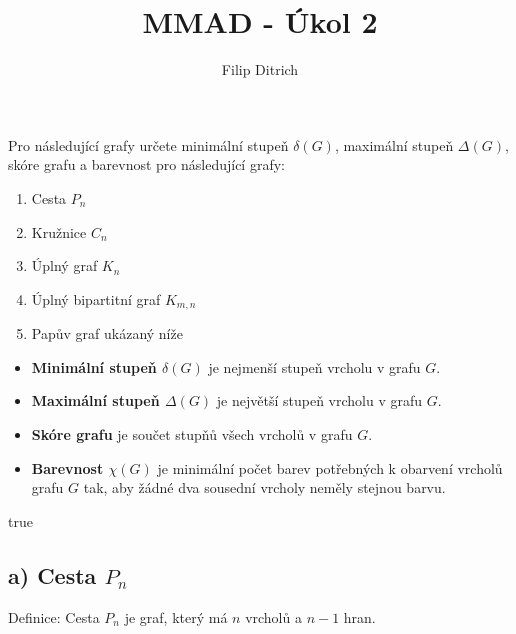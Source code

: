 \documentclass[10pt, a4paper]{ReportSheet}
\begin{document}
    \title{MMAD - Úkol 2}
    \author{Filip Ditrich}
    \date{
        \footnotesize{
        }
    }
    \maketitle

    \setcounter{tocdepth}{1}
    \pagestyle{plain}
    \renewcommand{\contentsname}{}
    \tableofcontents

    \begin{uloha}{1}{2}{
        Pro následující grafy určete minimální stupeň $\delta(G)$, maximální stupeň $\Delta(G)$, skóre grafu a barevnost pro následující grafy:
        \begin{enumerate}
            \renewcommand{\theenumi}{\alph{enumi}}
            \item Cesta $P_n$
            \item Kružnice $C_n$
            \item Úplný graf $K_n$
            \item Úplný bipartitní graf $K_{m,n}$
            \item Papův graf ukázaný níže
        \end{enumerate}

        \begin{itemize}
            \itemsep0.5em
            \item \textbf{Minimální stupeň $\delta(G)$} je nejmenší stupeň vrcholu v grafu $G$.
            \item \textbf{Maximální stupeň $\Delta(G)$} je největší stupeň vrcholu v grafu $G$.
            \item \textbf{Skóre grafu} je součet stupňů všech vrcholů v grafu $G$.
            \item \textbf{Barevnost $\chi(G)$} je minimální počet barev potřebných k obarvení vrcholů grafu $G$ tak,
            aby žádné dva sousední vrcholy neměly stejnou barvu.
        \end{itemize}
    }{true}

        \subsection{a) Cesta $P_n$}
        \label{subsec:ukol-2-1a-cesta}
        Definice: Cesta $P_n$ je graf, který má $n$ vrcholů a $n-1$ hran.\\


\end{uloha}
\end{document}
